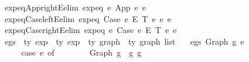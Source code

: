 \begin{isabellebody}
\isamarkupfalse%
\ expeq{\isacharunderscore}{\kern0pt}App{\isacharunderscore}{\kern0pt}rightE{\isacharbrackleft}{\kern0pt}elim{\isacharbang}{\kern0pt}{\isacharbrackright}{\kern0pt}{\isacharcolon}{\kern0pt}\ {\isachardoublequoteopen}expeq\ e{}\ {\isacharparenleft}{\kern0pt}App\ e{}{}\ e{}{}{\isacharparenright}{\kern0pt}{\isachardoublequoteclose}\isanewline
{}\isamarkupfalse%
\ expeq{\isacharunderscore}{\kern0pt}Case{\isacharunderscore}{\kern0pt}leftE{\isacharbrackleft}{\kern0pt}elim{\isacharbang}{\kern0pt}{\isacharbrackright}{\kern0pt}{\isacharcolon}{\kern0pt}\ {\isachardoublequoteopen}expeq\ {\isacharparenleft}{\kern0pt}Case\ e{}{}\ E{}\ T{}\ e{}{}\ e{}{}{\isacharparenright}{\kern0pt}\ e{}{\isachardoublequoteclose}\isanewline
{}\isamarkupfalse%
\ expeq{\isacharunderscore}{\kern0pt}Case{\isacharunderscore}{\kern0pt}rightE{\isacharbrackleft}{\kern0pt}elim{\isacharbang}{\kern0pt}{\isacharbrackright}{\kern0pt}{\isacharcolon}{\kern0pt}\ {\isachardoublequoteopen}expeq\ e{}\ {\isacharparenleft}{\kern0pt}Case\ e{}{}\ E{}\ T{}\ e{}{}\ e{}{}{\isacharparenright}{\kern0pt}{\isachardoublequoteclose}\isanewline
\isanewline
\isanewline
{}\isamarkupfalse%
\ egs\ {\isacharcolon}{\kern0pt}{\isacharcolon}{\kern0pt}\ {\isachardoublequoteopen}{\isacharprime}{\kern0pt}ty\ exp\ {\isacharequal}{\kern0pt}{\isachargreater}{\kern0pt}\ {\isacharprime}{\kern0pt}ty\ exp\ {\isacharequal}{\kern0pt}{\isachargreater}{\kern0pt}\ {\isacharparenleft}{\kern0pt}{\isacharprime}{\kern0pt}ty\ graph\ {\isacharasterisk}{\kern0pt}\ {\isacharprime}{\kern0pt}ty\ graph{\isacharparenright}{\kern0pt}\ list{\isachardoublequoteclose}\ \isanewline
\ \ {\isachardoublequoteopen}egs\ {\isacharparenleft}{\kern0pt}Graph\ g{}{\isacharparenright}{\kern0pt}\ e{}\ {\isacharequal}{\kern0pt}\isanewline
\ \ \ \ \ {\isacharparenleft}{\kern0pt}case\ e{}\ of\isanewline
\ \ \ \ \ \ \ \ Graph\ g{}\ {\isacharequal}{\kern0pt}{\isachargreater}{\kern0pt}\ {\isacharbrackleft}{\kern0pt}{\isacharparenleft}{\kern0pt}g{}{\isacharcomma}{\kern0pt}\ g{}{\isacharparenright}{\kern0pt}{\isacharbrackright}{\kern0pt}\isanewline

\end{isabellebody}
